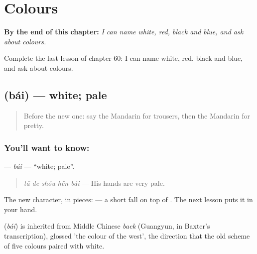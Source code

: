 
\chapter{Colours}
\label{ch:zh-colours}

\begin{chapteropening}
\textbf{By the end of this chapter:} \emph{I can name white, red, black and blue, and ask about colours.}

Complete the last lesson of chapter 60: I can name white, red, black and blue, and ask about colours.
\end{chapteropening}

\section[\texorpdfstring{\zh{白} (bái)}{白 (bái)}]{ (bái) — white; pale}

\label{lesson:ZH-C60-bai}



\begin{quote}
Before the new one: say the Mandarin for trousers, then the Mandarin for pretty.
\end{quote}

\subsection*{You'll want to know: }
\textbf{} — \emph{bái} — \textquotedblleft{}white; pale\textquotedblright{}.

\begin{quote}
\textbf{} \emph{tā de shǒu hěn bái} — His hands are very pale.
\end{quote}

The new character, in pieces:  — a short fall on top of . The next lesson puts it in your hand.

\begin{cousinweb}
\textbf{} (\emph{bái}) is inherited from Middle Chinese \emph{baek} (Guangyun, in Baxter's transcription), glossed 'the colour of the west', the direction that the old scheme of five colours paired with white.
\end{cousinweb}


